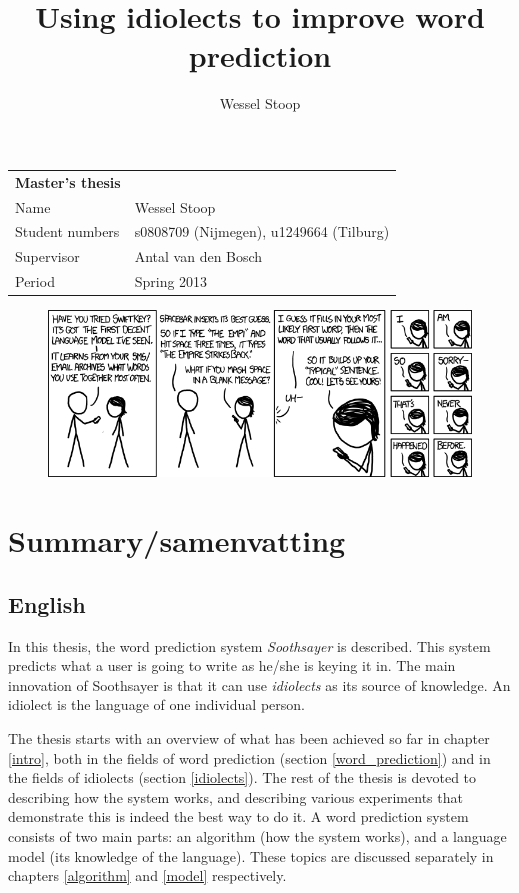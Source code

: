 \documentclass[12pt]{article}
\title{Using idiolects to improve word prediction}
\author{Wessel Stoop}
\let\stdsection\section
\renewcommand\section{\newpage\stdsection}
\let\originaltable\table
\let\endoriginaltable\endtable
\renewenvironment{table}[1][ht]{%
  \originaltable[#1]
  \centering}%
  {\endoriginaltable}
\begin{document}
\begin{table}[b]
\begin{tabular}{ll}
\textbf{Master's thesis}&\\
Name&Wessel Stoop\\
Student numbers&s0808709 (Nijmegen), u1249664 (Tilburg)\\
Supervisor&Antal van den Bosch\\
Period&Spring 2013\\
\end{tabular}
\end{table}

\maketitle
\thispagestyle{empty}

\begin{figure}
\includegraphics[scale=0.5]{swiftkey}
\end{figure}

\clearpage

\tableofcontents
\listoftables
\listoffigures

\section{Summary/samenvatting}

\subsection{English}
In this thesis, the word prediction system \emph{Soothsayer} is described. This system predicts what a user is going to write as he/she is keying it in. The main innovation of Soothsayer is that it can use \emph{idiolects} as its source of knowledge. An idiolect is the language of one individual person. 

The thesis starts with an overview of what has been achieved so far in chapter \ref{intro}, both in the fields of word prediction (section \ref{word_prediction}) and in the fields of idiolects (section \ref{idiolects}). The rest of the thesis is devoted to describing how the system works, and describing various experiments that demonstrate this is indeed the best way to do it. A word prediction system consists of two main parts: an algorithm (how the system works), and a language model (its knowledge of the language). These topics are discussed separately in chapters \ref{algorithm} and \ref{model} respectively.
\end{document}

